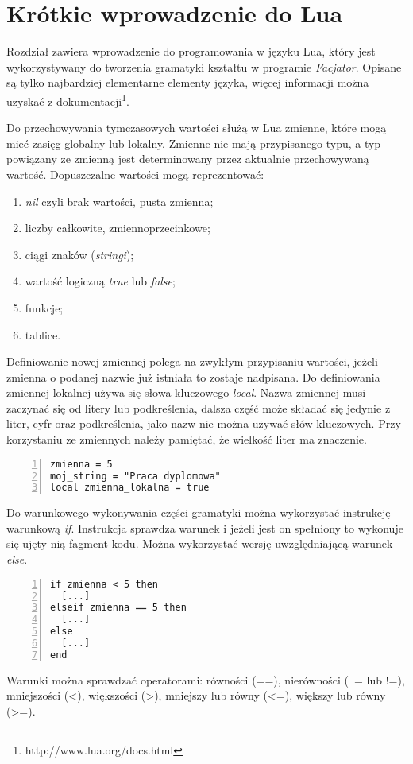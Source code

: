 \section{Krótkie wprowadzenie do Lua}
Rozdział zawiera wprowadzenie do programowania w języku Lua, który jest
wykorzystywany do tworzenia gramatyki kształtu w programie \emph{Facjator}.
Opisane są tylko najbardziej elementarne elementy języka, więcej informacji
można uzyskać z dokumentacji\footnote{http://www.lua.org/docs.html}.

Do przechowywania tymczasowych wartości służą w Lua zmienne, które mogą mieć
zasięg globalny lub lokalny. Zmienne nie mają przypisanego typu, a typ powiązany
ze zmienną jest determinowany przez aktualnie przechowywaną wartość.
Dopuszczalne wartości mogą reprezentować:
\begin{enumerate}
  \item \emph{nil} czyli brak wartości, pusta zmienna;
  \item liczby całkowite, zmiennoprzecinkowe;
  \item ciągi znaków (\emph{stringi});
  \item wartość logiczną \emph{true} lub \emph{false};
  \item funkcje;
  \item tablice.
\end{enumerate}
Definiowanie nowej zmiennej polega na zwykłym przypisaniu wartości,
jeżeli zmienna o podanej nazwie już istniała to zostaje nadpisana. Do
definiowania zmiennej lokalnej używa się słowa kluczowego \emph{local}. Nazwa
zmiennej musi zaczynać się od litery lub podkreślenia, dalsza część może składać
się jedynie z liter, cyfr oraz podkreślenia, jako nazw nie można używać słów
kluczowych. Przy korzystaniu ze zmiennych należy pamiętać, że wielkość liter ma
znaczenie.
{
\small
\begin{lstlisting}[numbers=left,frame=single,numberstyle=\tiny,backgroundcolor=\color{code_back},breaklines=true]
zmienna = 5
moj_string = "Praca dyplomowa"
local zmienna_lokalna = true
\end{lstlisting}
}

Do warunkowego wykonywania części gramatyki można wykorzystać instrukcję
warunkową \emph{if}. Instrukcja sprawdza warunek i jeżeli jest on spełniony to
wykonuje się ujęty nią fagment kodu. Można wykorzystać wersję uwzględniającą
warunek \emph{else}.
{
\small
\begin{lstlisting}[numbers=left,frame=single,numberstyle=\tiny,backgroundcolor=\color{code_back},breaklines=true]
if zmienna < 5 then
  [...]
elseif zmienna == 5 then
  [...]
else
  [...]
end
\end{lstlisting}
}
Warunki można sprawdzać operatorami: równości (==), nierówności (~= lub !=),
mniejszości (<), większości (>), mniejszy lub równy (<=), większy lub równy
(>=).

